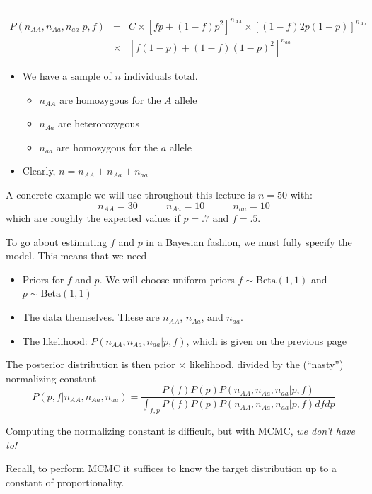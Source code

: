 \hrule
{\small
\begin{eqnarray*}
P(n_{AA},n_{Aa},n_{aa}|p,f) &=& C\times [fp + (1-f)p^2]^{n_{AA}} \times [(1-f)2p(1-p)]^{n_{Aa}} \\
 &\times & [ f(1-p) + (1-f)(1-p)^2]^{n_{aa}}
\end{eqnarray*}
}




\begin{itemize}
\item We have a sample of $n$ individuals total.
\begin{itemize}
\item $n_{AA}$ are homozygous for the $A$ allele
\item $n_{Aa}$ are heterorozygous
\item $n_{aa}$ are homozygous for the $a$ allele
\end{itemize}
\item Clearly, $n=n_{AA} + n_{Aa} + n_{aa}$
\end{itemize}

A concrete example we will use throughout this lecture is $n=50$ with:
\[
n_{AA}=30~~~~~~~~~~~~~n_{Aa}=10~~~~~~~~~~~~~n_{aa}=10
\]
which are roughly the expected values if $p=.7$ and $f=.5$.




To go about estimating $f$ and $p$ in a Bayesian fashion, we must fully specify the model.  This means that we need 
\begin{itemize}
\item Priors for $f$ and $p$.  We will choose uniform priors $f\sim\mathrm{Beta}(1,1)$ and $p\sim\mathrm{Beta}(1,1)$
\item The data themselves.  These are $n_{AA}$, $n_{Aa}$, and $n_{aa}$.
\item The likelihood: $P(n_{AA},n_{Aa},n_{aa}|p,f)$, which is given on the previous page
\end{itemize}
The posterior distribution is then prior $\times$ likelihood, divided by the (``nasty'') normalizing constant
\[
P(p,f|n_{AA},n_{Aa},n_{aa}) = \frac{P(f)P(p)P(n_{AA},n_{Aa},n_{aa}|p,f)}{\int_{f,p}P(f)P(p)P(n_{AA},n_{Aa},n_{aa}|p,f)dfdp}
\]


\newpage
Computing the normalizing constant is difficult, but with MCMC, {\em we don't have to!}

Recall, to perform MCMC it suffices to know the target distribution up to a constant of proportionality. 

